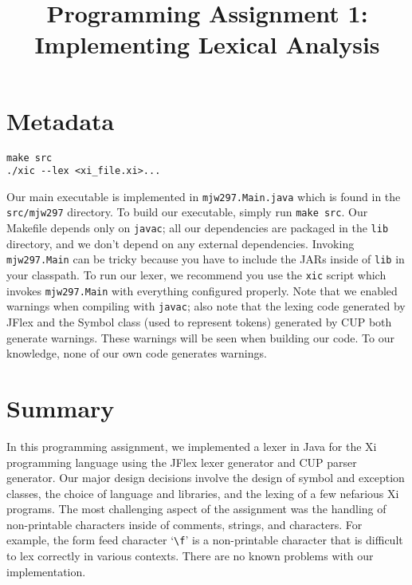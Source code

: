 \documentclass{hw}
\title{Programming Assignment 1:\\ Implementing Lexical Analysis}
\begin{document}
\maketitle

\section{Metadata}\label{sec:metadata}
\begin{center}
\begin{BVerbatim}
make src
./xic --lex <xi_file.xi>...
\end{BVerbatim}
\end{center}

Our main executable is implemented in \texttt{mjw297.Main.java} which is found
in the \texttt{src/mjw297} directory. To build our executable, simply run
\texttt{make src}. Our Makefile depends only on \texttt{javac}; all our
dependencies are packaged in the \texttt{lib} directory, and we don't depend on
any external dependencies. Invoking \texttt{mjw297.Main} can be tricky because
you have to include the JARs inside of \texttt{lib} in your classpath. To run
our lexer, we recommend you use the \texttt{xic} script which invokes
\texttt{mjw297.Main} with everything configured properly. Note that we enabled
warnings when compiling with \texttt{javac}; also note that the lexing code
generated by JFlex and the Symbol class (used to represent tokens) generated by
CUP both generate warnings. These warnings will be seen when building our code.
To our knowledge, none of our own code generates warnings.

\section{Summary}\label{sec:summary}
In this programming assignment, we implemented a lexer in Java for the Xi
programming language using the JFlex lexer generator and CUP parser generator.
Our major design decisions involve the design of symbol and exception classes,
the choice of language and libraries, and the lexing of a few nefarious Xi
programs. The most challenging aspect of the assignment was the handling of
non-printable characters inside of comments, strings, and characters. For
example, the form feed character `\verb$\f$' is a non-printable character that
is difficult to lex correctly in various contexts. There are no known problems
with our implementation.
\end{document}
